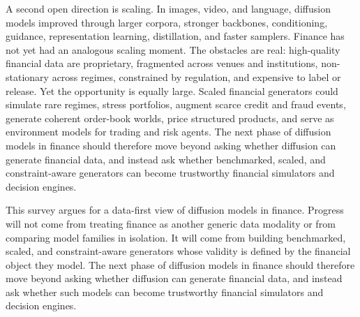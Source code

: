 \documentclass[sigconf,nonacm]{acmart}
\begin{document}
A second open direction is scaling. In images, video, and language, diffusion
models improved through larger corpora, stronger backbones, conditioning,
guidance, representation learning, distillation, and faster samplers. Finance has
not yet had an analogous scaling moment. The obstacles are real: high-quality
financial data are proprietary, fragmented across venues and institutions,
non-stationary across regimes, constrained by regulation, and expensive to label
or release. Yet the opportunity is equally large. Scaled financial generators
could simulate rare regimes, stress portfolios, augment scarce credit and fraud
events, generate coherent order-book worlds, price structured products, and serve
as environment models for trading and risk agents. The next phase of diffusion
models in finance should therefore move beyond asking whether diffusion can
generate financial data, and instead ask whether benchmarked, scaled, and
constraint-aware generators can become trustworthy financial simulators and
decision engines.

This survey argues for a data-first view of diffusion models in finance.
Progress will not come from treating finance as another generic data modality or
from comparing model families in isolation. It will come from building
benchmarked, scaled, and constraint-aware generators whose validity is defined by
the financial object they model. The next phase of diffusion models in finance
should therefore move beyond asking whether diffusion can generate financial
data, and instead ask whether such models can become trustworthy financial
simulators and decision engines.



\end{document}
